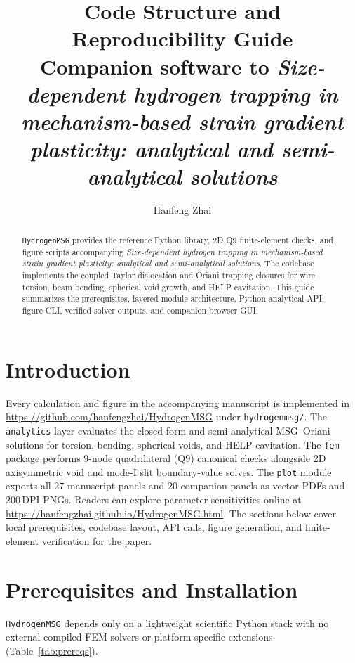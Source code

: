 \documentclass[11pt]{article}
\title{\textbf{Code Structure and Reproducibility Guide}\\[0.25em]{\large Companion software to \emph{Size-dependent hydrogen trapping in mechanism-based strain gradient plasticity: analytical and semi-analytical solutions}}}
\author{Hanfeng Zhai}
\date{}
\begin{document}
\maketitle

\begin{abstract}
\texttt{HydrogenMSG} provides the reference Python library, 2D Q9 finite-element checks, and figure scripts accompanying \emph{Size-dependent hydrogen trapping in mechanism-based strain gradient plasticity: analytical and semi-analytical solutions}.
%
The codebase implements the coupled Taylor dislocation and Oriani trapping closures for wire torsion, beam bending, spherical void growth, and HELP cavitation.
%
This guide summarizes the prerequisites, layered module architecture, Python analytical API, figure CLI, verified solver outputs, and companion browser GUI.
\end{abstract}

\section{Introduction}

Every calculation and figure in the accompanying manuscript is implemented in \url{https://github.com/hanfengzhai/HydrogenMSG} under \texttt{hydrogenmsg/}.
%
The \texttt{analytics} layer evaluates the closed-form and semi-analytical MSG--Oriani solutions for torsion, bending, spherical voids, and HELP cavitation.
%
The \texttt{fem} package performs 9-node quadrilateral (Q9) canonical checks alongside 2D axisymmetric void and mode-I slit boundary-value solves.
%
The \texttt{plot} module exports all $27$ manuscript panels and $20$ companion panels as vector PDFs and $200$\,DPI PNGs.
%
Readers can explore parameter sensitivities online at \url{https://hanfengzhai.github.io/HydrogenMSG.html}.
%
The sections below cover local prerequisites, codebase layout, API calls, figure generation, and finite-element verification for the paper.

\section{Prerequisites and Installation}

\texttt{HydrogenMSG} depends only on a lightweight scientific Python stack with no external compiled FEM solvers or platform-specific extensions (Table~\ref{tab:prereqs}).
\end{document}
